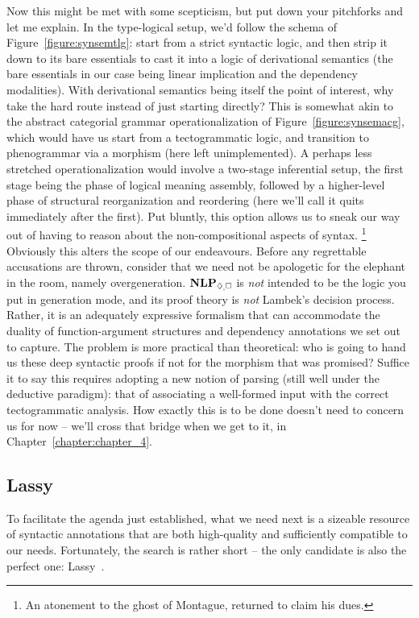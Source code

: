 Now this might be met with some scepticism, but put down your pitchforks and let me explain.
In the type-logical setup, we'd follow the schema of Figure~\ref{figure:synsemtlg}: start from a strict syntactic logic, and then strip it down to its bare essentials to cast it into a logic of derivational semantics (the bare essentials in our case being linear implication and the dependency modalities).
With derivational semantics being itself the point of interest, why take the hard route instead of just starting directly?
This is somewhat akin to the abstract categorial grammar operationalization of Figure~\ref{figure:synsemacg}, which would have us start from a tectogrammatic logic, and transition to phenogrammar via a morphism (here left unimplemented).
A perhaps less stretched operationalization would involve a two-stage inferential setup, the first stage being the phase of logical meaning assembly, followed by a higher-level phase of structural reorganization and reordering (here we'll call it quits immediately after the first).
Put bluntly, this option allows us to sneak our way out of having to reason about the non-compositional aspects of syntax.%
	\footnote{An atonement to the ghost of Montague, returned to claim his dues.}
Obviously this alters the scope of our endeavours.
Before any regrettable accusations are thrown, consider that we need not be apologetic for the elephant in the room, namely overgeneration.
$\NLP_{\ddia, \bx}$ is \textit{not} intended to be the logic you put in generation mode, and its proof theory is \textit{not} Lambek's decision process.
Rather, it is an adequately expressive formalism that can accommodate the duality of function-argument structures and dependency annotations we set out to capture.
The problem is more practical than theoretical: who is going to hand us these deep syntactic proofs if not for the morphism that was promised?
Suffice it to say this requires adopting a new notion of parsing (still well under the deductive paradigm): that of associating a well-formed input with the correct tectogrammatic analysis.
How exactly this is to be done doesn't need to concern us for now -- we'll cross that bridge when we get to it, in Chapter~\ref{chapter:chapter_4}.

\subsection{Lassy}
To facilitate the agenda just established, what we need next is a sizeable resource of syntactic annotations that are both high-quality and sufficiently compatible to our needs.
Fortunately, the search is rather short -- the only candidate is also the perfect one: Lassy~\cite{van2013large}.

